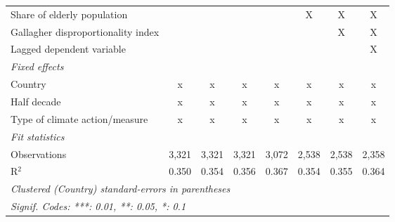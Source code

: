 \begin{tabular}{lccccccc}
   Share of elderly population                                        &                &               &                &               & X             & X             & X\\  
   Gallagher disproportionality index                                 &                &               &                &               &               & X             & X\\  
   Lagged dependent variable                                          &                &               &                &               &               &               & X\\  
   \emph{Fixed effects}\\
   Country                                                            & x              & x             & x              & x             & x             & x             & x\\  
   Half decade                                                        & x              & x             & x              & x             & x             & x             & x\\  
   Type of climate action/measure                                     & x              & x             & x              & x             & x             & x             & x\\  
   \midrule \emph{Fit statistics}\\
   Observations                                                       & 3,321          & 3,321         & 3,321          & 3,072         & 2,538         & 2,538         & 2,358\\  
   R$^2$                                                              & 0.350          & 0.354         & 0.356          & 0.367         & 0.354         & 0.355         & 0.364\\  
   \midrule
   \multicolumn{8}{l}{\emph{Clustered (Country) standard-errors in parentheses}}\\
   \multicolumn{8}{l}{\emph{Signif. Codes: ***: 0.01, **: 0.05, *: 0.1}}\\
\end{tabular}
\par\endgroup


